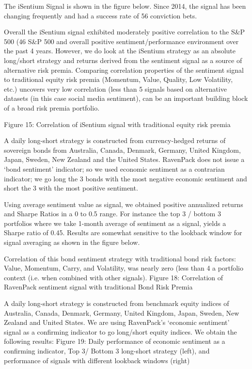 \documentclass[a4paper]{article}
\begin{document}
 The iSentium Signal is shown in the figure below. Since 2014, the signal has been changing frequently and had a success
rate of 56%
conviction bets.

Overall the iSentium signal exhibited moderately positive correlation to the S\&P 500 (46%
S\&P 500 and overall positive sentiment/performance environment over the past 4 years. However, we do look at the
iSentium strategy as an absolute long/short strategy and returns derived from the sentiment signal as a source of alternative
risk premia. Comparing correlation properties of the sentiment signal to traditional equity risk premia (Momentum, Value,
Quality, Low Volatility, etc.) uncovers very low correlation (less than 5%
signals based on alternative datasets (in this case social media sentiment), can be an important building block of a broad risk
premia portfolio.

Figure 15: Correlation of iSentium signal with traditional equity risk premia

A daily long-short strategy is constructed from currency-hedged returns of sovereign bonds from Australia, Canada,
Denmark, Germany, United Kingdom, Japan, Sweden, New Zealand and the United States. RavenPack does not issue a
‘bond sentiment’ indicator; so we used economic sentiment as a contrarian indicator; we go long the 3 bonds with the most
negative economic sentiment and short the 3 with the most positive sentiment.

Using average sentiment value as signal, we obtained positive annualized returns and Sharpe Ratios in a 0 to 0.5 range.
For instance the top 3 / bottom 3 portfolios where we take 1-month average of sentiment as a signal, yields a Sharpe ratio of
0.45. Results are somewhat sensitive to the lookback window for signal averaging as shown in the figure below.

Correlation of this bond sentiment strategy with traditional bond risk factors: Value, Momentum, Carry, and Volatility, was
nearly zero (less than 4%
a portfolio context (i.e. when combined with other signals).
Figure 18: Correlation of RavenPack sentiment signal with traditional Bond Risk Premia

A daily long-short strategy is constructed from benchmark equity indices of Australia, Canada, Denmark, Germany, United
Kingdom, Japan, Sweden, New Zealand and United States. We are using RavenPack’s ‘economic sentiment’ signal as a
confirming indicator to go long/short equity indices. We obtain the following results:
Figure 19: Daily performance of economic sentiment as a confirming indicator, Top 3/ Bottom 3 long-short strategy (left), and performance of
signals with different lookback windows (right)
\end{document}

